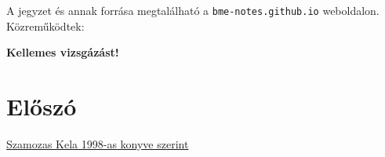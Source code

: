 


\usepackage{relsize}
\usepackage{pdfpages}

\newcommand{\Gorog}[1]{\mathlarger{\mathlarger{\mathlarger{#1}}}}
\newcommand{\Vegtelen}{\limits_{-\infty}^{+\infty}}
\newcommand{\EX}{\textbf{E}X}
\newcommand{\EY}{\textbf{E}Y}
\newcommand{\szoras}{\Gorog{\sigma}X}
\newcommand{\Szoras}{\Gorog{\sigma}^2X}
\newcommand{\forceindent}{\leavevmode{\parindent=1em\indent}}





\begin{titlepage}
		\centering
		\vspace{5cm}\par
		\maketitle
		\large A jegyzet és annak forrása megtalálható a \texttt{bme-notes.github.io} weboldalon.
		\vfill
		Közreműködtek: \the\segitettek
		\normalsize
\end{titlepage}


\noindent \textbf{Kellemes vizsgázást!}

\tableofcontents{}

\section{Előszó}
\href{http://vik.wiki/images/e/e7/Valszam_konyv_olvashato_kela.pdf}{Szamozas Kela 1998-as konyve szerint}



